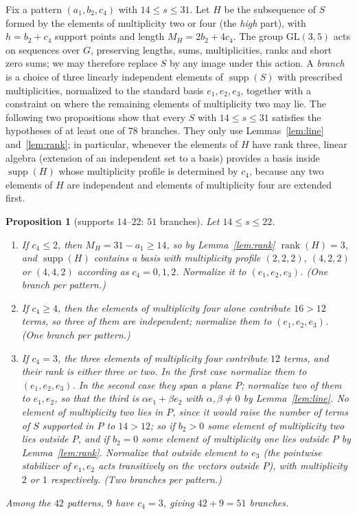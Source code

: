 \documentclass[11pt]{article}
\newtheorem{proposition}[theorem]{Proposition}
\theoremstyle{definition}
\theoremstyle{remark}
\newcommand{\supp}{\operatorname{supp}}
\newcommand{\rank}{\operatorname{rank}}
\begin{document}
Fix a pattern $(a_1,b_2,c_4)$ with $14\le s\le31$. Let $H$ be the subsequence of $S$ formed by the elements of multiplicity two or four (the \emph{high} part), with $h=b_2+c_4$ support points and length $M_H=2b_2+4c_4$. The group $\mathrm{GL}(3,5)$ acts on sequences over $G$, preserving lengths, sums, multiplicities, ranks and short zero sums; we may therefore replace $S$ by any image under this action. A \emph{branch} is a choice of three linearly independent elements of $\supp(S)$ with prescribed multiplicities, normalized to the standard basis $e_1,e_2,e_3$, together with a constraint on where the remaining elements of multiplicity two may lie. The following two propositions show that every $S$ with $14\le s\le31$ satisfies the hypotheses of at least one of $78$ branches. They only use Lemmas~\ref{lem:line} and~\ref{lem:rank}; in particular, whenever the elements of $H$ have rank three, linear algebra (extension of an independent set to a basis) provides a basis inside $\supp(H)$ whose multiplicity profile is determined by $c_4$, because any two elements of $H$ are independent and elements of multiplicity four are extended first.

\begin{proposition}[supports $14$--$22$: $51$ branches]\label{prop:lower}
Let $14\le s\le22$.
\begin{enumerate}[label=\textup{(L\arabic*)},leftmargin=3em]
\item If $c_4\le2$, then $M_H=31-a_1\ge14$, so by Lemma~\ref{lem:rank} $\rank(H)=3$, and $\supp(H)$ contains a basis with multiplicity profile $(2,2,2)$, $(4,2,2)$ or $(4,4,2)$ according as $c_4=0,1,2$. Normalize it to $(e_1,e_2,e_3)$. (One branch per pattern.)
\item If $c_4\ge4$, then the elements of multiplicity four alone contribute $16>12$ terms, so three of them are independent; normalize them to $(e_1,e_2,e_3)$. (One branch per pattern.)
\item If $c_4=3$, the three elements of multiplicity four contribute $12$ terms, and their rank is either three or two. In the first case normalize them to $(e_1,e_2,e_3)$. In the second case they span a plane $P$; normalize two of them to $e_1,e_2$, so that the third is $\alpha e_1+\beta e_2$ with $\alpha,\beta\ne0$ by Lemma~\ref{lem:line}. No element of multiplicity two lies in $P$, since it would raise the number of terms of $S$ supported in $P$ to $14>12$; so if $b_2>0$ some element of multiplicity two lies outside $P$, and if $b_2=0$ some element of multiplicity one lies outside $P$ by Lemma~\ref{lem:rank}. Normalize that outside element to $e_3$ (the pointwise stabilizer of $e_1,e_2$ acts transitively on the vectors outside $P$), with multiplicity $2$ or $1$ respectively. (Two branches per pattern.)
\end{enumerate}
Among the $42$ patterns, $9$ have $c_4=3$, giving $42+9=51$ branches.
\end{proposition}
\end{document}
